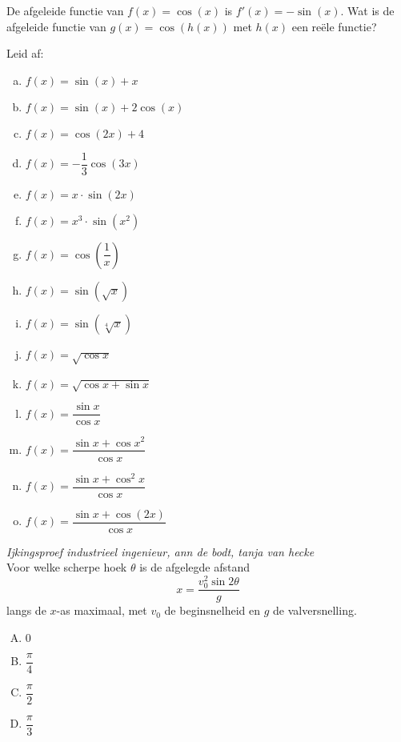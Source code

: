 \documentclass[a4paper,12pt]{article}
\begin{document}
\begin{oefening}
De afgeleide functie van $f(x)=\cos(x)$ is $f'(x)=-\sin(x)$. Wat is de afgeleide functie van $g(x)=\cos(h(x))$ met $h(x)$ een reële functie?
\end{oefening}

\begin{oefening}
Leid af:
\begin{multicols}{2}
\begin{enumerate}[(a)]
  \itemsep0.5em
  \item $f(x)=\sin(x)+x$
  \item $f(x)=\sin(x)+2\cos(x)$
  \item $f(x)=\cos(2x)+4$
  \item $f(x)=-\dfrac{1}{3}\cos(3x)$
  \item $f(x)=x\cdot\sin(2x)$
  \item $f(x)=x^3\cdot\sin(x^2)$
  \item $f(x)=\cos(\dfrac{1}{x})$
  \item $f(x)=\sin(\sqrt{x})$
  \item $f(x)=\sin(\sqrt[4]{x})$
  \item $f(x)=\sqrt{\cos x}$
  \item $f(x)=\sqrt{\cos x+\sin x}$
  \item $f(x)=\dfrac{\sin x}{\cos x}$
  \item $f(x)=\dfrac{\sin x + \cos x^2}{\cos x}$
  \item $f(x)=\dfrac{\sin x + \cos^2 x}{\cos x}$
  \item $f(x)=\dfrac{\sin x + \cos(2x)}{\cos x}$
\end{enumerate}
\end{multicols}
\end{oefening}

\begin{oefening}
{\em \scriptsize Ijkingsproef industrieel ingenieur, ann de bodt, tanja van hecke}\\
Voor welke scherpe hoek $\theta$ is de afgelegde afstand
$$x=\dfrac{v^2_0 \sin 2\theta}{g}$$
langs de $x$-as maximaal, met $v_0$ de beginsnelheid en $g$ de valversnelling.
\begin{enumerate}[(A)]
  \itemsep.3em
  \item $0$
  \item $\dfrac{\pi}{4}$
  \item $\dfrac{\pi}{2}$
  \item $\dfrac{\pi}{3}$
\end{enumerate}
\end{oefening}

\end{document}
